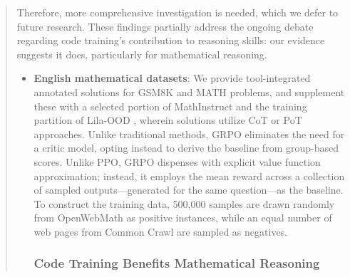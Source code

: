 \begin{abstract}
\begin{itemize}[topsep=0pt]
Therefore, more comprehensive investigation is needed, which we defer to future research. These findings partially address the ongoing debate regarding code training’s contribution to reasoning skills: our evidence suggests it does, particularly for mathematical reasoning. \begin{itemize}[topsep=0pt]
    \item \textbf{English mathematical datasets}: We provide tool-integrated annotated solutions for GSM8K and MATH problems, and supplement these with a selected portion of MathInstruct \citep{MathInstruct} and the training partition of Lila-OOD \citep{lila}, wherein solutions utilize CoT or PoT approaches. Unlike traditional methods, GRPO eliminates the need for a critic model, opting instead to derive the baseline from group-based scores. Unlike PPO, GRPO dispenses with explicit value function approximation; instead, it employs the mean reward across a collection of sampled outputs—generated for the same question—as the baseline. To construct the training data, 500,000 samples are drawn randomly from OpenWebMath as positive instances, while an equal number of web pages from Common Crawl are sampled as negatives. \subsubsection{Code Training Benefits Mathematical Reasoning}


\end{itemize}
\end{itemize}
\end{abstract}
